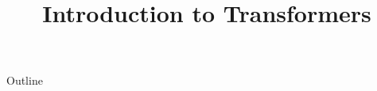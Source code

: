 \documentclass[xcolor=dvipsnames,compress,t,pdf,9pt]{beamer}
\title[\insertframenumber /\inserttotalframenumber]{Introduction to Transformers}
\begin{document}
	\begin{frame}
	\titlepage
	\end{frame}
	
	\begin{frame}{Outline}
	    \tableofcontents
	\end{frame}

%	
	
	
\end{document}
